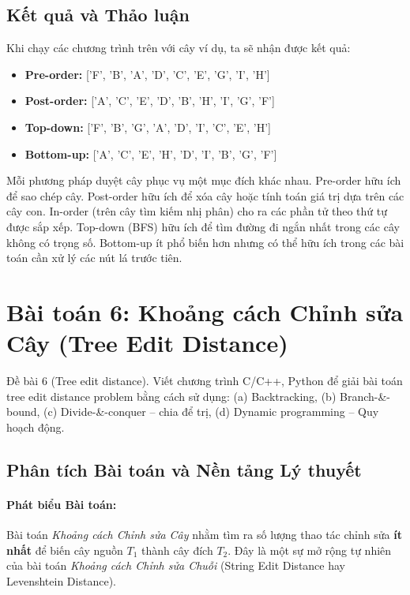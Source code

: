 \documentclass[a4paper,12pt]{article}
\begin{document}
\subsection{Kết quả và Thảo luận}
Khi chạy các chương trình trên với cây ví dụ, ta sẽ nhận được kết quả:
\begin{itemize}
    \item \textbf{Pre-order:} ['F', 'B', 'A', 'D', 'C', 'E', 'G', 'I', 'H']
    \item \textbf{Post-order:} ['A', 'C', 'E', 'D', 'B', 'H', 'I', 'G', 'F']
    \item \textbf{Top-down:} ['F', 'B', 'G', 'A', 'D', 'I', 'C', 'E', 'H']
    \item \textbf{Bottom-up:} ['A', 'C', 'E', 'H', 'D', 'I', 'B', 'G', 'F']
\end{itemize}
Mỗi phương pháp duyệt cây phục vụ một mục đích khác nhau. Pre-order hữu ích để sao chép cây. Post-order hữu ích để xóa cây hoặc tính toán giá trị dựa trên các cây con. In-order (trên cây tìm kiếm nhị phân) cho ra các phần tử theo thứ tự được sắp xếp. Top-down (BFS) hữu ích để tìm đường đi ngắn nhất trong các cây không có trọng số. Bottom-up ít phổ biến hơn nhưng có thể hữu ích trong các bài toán cần xử lý các nút lá trước tiên.


\section{Bài toán 6: Khoảng cách Chỉnh sửa Cây (Tree Edit Distance)}
\begin{problembox}{Đề bài 6}
    (Tree edit distance). Viết chương trình C/C++, Python để giải bài toán tree edit distance problem bằng cách sử dụng: (a) Backtracking, (b) Branch-\&-bound, (c) Divide-\&-conquer – chia để trị, (d) Dynamic programming – Quy hoạch động.
\end{problembox}

\subsection{Phân tích Bài toán và Nền tảng Lý thuyết}
\paragraph{Phát biểu Bài toán:}
Bài toán \textit{Khoảng cách Chỉnh sửa Cây} nhằm tìm ra số lượng thao tác chỉnh sửa \textbf{ít nhất} để biến cây nguồn $T_1$ thành cây đích $T_2$. Đây là một sự mở rộng tự nhiên của bài toán \textit{Khoảng cách Chỉnh sửa Chuỗi} (String Edit Distance hay Levenshtein Distance).
\end{document}
